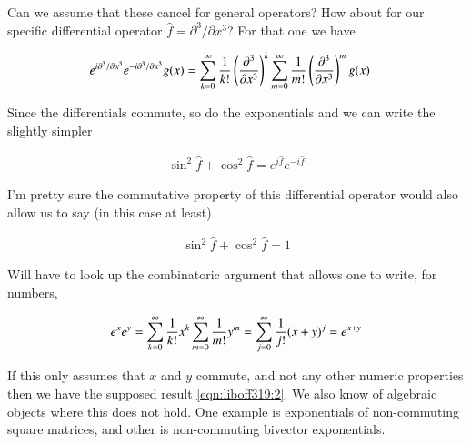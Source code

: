 Can we assume that these cancel for general operators?  How about for our specific differential operator $\hat{f} = \partial^3/\partial x^3$?  For that one we have

\begin{align*}
e^{i \partial^3/\partial x^3} e^{-i \partial^3/\partial x^3} g(x)
&=
\sum_{k=0}^\infty 
\frac{1}{k!} 
\left(\frac{\partial^3}{\partial x^3}\right)^k
\sum_{m=0}^\infty 
\frac{1}{m!} 
\left(\frac{\partial^3}{\partial x^3}\right)^m g(x)
\end{align*}

Since the differentials commute, so do the exponentials and we can write the slightly simpler

\begin{align*}
\sin^2 \hat{f} + \cos^2 \hat{f} = e^{i\hat{f}} e^{-i\hat{f}} 
\end{align*}

I'm pretty sure the commutative property of this differential operator would also allow us to say (in this case at least)

\begin{align*}
\sin^2 \hat{f} + \cos^2 \hat{f} = 1
\end{align*}

Will have to look up the combinatoric argument that allows one to write, for numbers,

\begin{align*}
e^x e^y = 
\sum_{k=0}^\infty 
\frac{1}{k!} x^k 
\sum_{m=0}^\infty 
\frac{1}{m!} y^m 
=
\sum_{j=0}^\infty 
\frac{1}{j!} (x+y)^j 
= e^{x+y}
\end{align*}

If this only assumes that $x$ and $y$ commute, and not any other numeric properties then we have the supposed result \ref{eqn:liboff319:2}.  We also know of algebraic objects where this does not hold.  One example is exponentials of non-commuting square matrices, and other is non-commuting bivector exponentials.

\EndArticle
